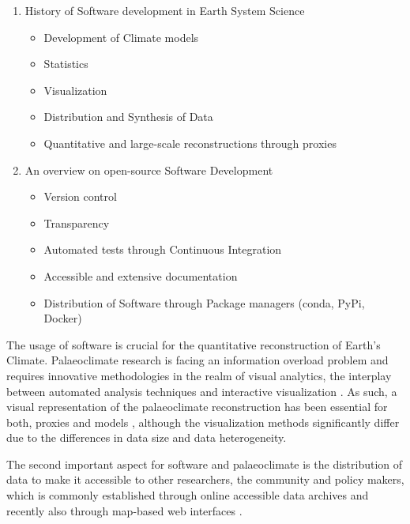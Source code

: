 \begin{refsection}
\begin{enumerate}
	\item History of Software development in Earth System Science
	\begin{itemize}
		\item Development of Climate models
		\item Statistics
		\item Visualization
		\item Distribution and Synthesis of Data
		\item Quantitative and large-scale reconstructions through proxies
	\end{itemize}
	\item An overview on open-source Software Development
	\begin{itemize}
		\item
		Version control
		\item
		Transparency
		\item
		Automated tests through Continuous Integration
		\item
		Accessible and extensive documentation
		\item
		Distribution of Software through Package managers (conda, PyPi,
		Docker)
	\end{itemize}
\end{enumerate}

The usage of software is crucial for the quantitative reconstruction of Earth's Climate. Palaeoclimate research is facing an information overload problem and requires innovative methodologies in the realm of visual analytics, the interplay between automated analysis techniques and interactive visualization \citep{KeimAndrienkoFeketeEtAl2008, Nocke2014}. As such, a visual representation of the palaeoclimate reconstruction has been essential for both, proxies \citep{Nichols1967, Bradley1985, Grimm1988} and models \citep{Phillips1956, RautenhausBoettingerSiemenEtAl2018, NockeSterzelBoettingerEtAl2008, Nocke2014, BoettingerRoeber2019}, although the visualization methods significantly differ due to the differences in data size and data heterogeneity.

The second important aspect for software and palaeoclimate is the distribution of data to make it accessible to other researchers, the community and policy makers, which is commonly established through online accessible data archives and recently also through map-based web interfaces \citep{WilliamsGrimmBloisEtAl2018, BollietBrockmannMassonDelmotteEtAl2016}.


\end{refsection}
